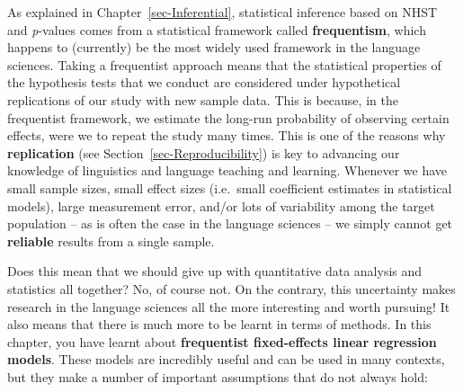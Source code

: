 \documentclass[
  letterpaper,
  DIV=11,
  numbers=noendperiod]{scrreprt}
\begin{document}
As explained in Chapter~\ref{sec-Inferential}, statistical inference
based on NHST and \emph{p}-values comes from a statistical framework
called \textbf{frequentism}, which happens to (currently) be the most
widely used framework in the language sciences. Taking a frequentist
approach means that the statistical properties of the hypothesis tests
that we conduct are considered under hypothetical replications of our
study with new sample data. This is because, in the frequentist
framework, we estimate the long-run probability of observing certain
effects, were we to repeat the study many times. This is one of the
reasons why \textbf{replication} (see Section~\ref{sec-Reproducibility})
is key to advancing our knowledge of linguistics and language teaching
and learning. Whenever we have small sample sizes, small effect sizes
(i.e.~small coefficient estimates in statistical models), large
measurement error, and/or lots of variability among the target
population -- as is often the case in the language sciences -- we simply
cannot get \textbf{reliable} results from a single sample.

Does this mean that we should give up with quantitative data analysis
and statistics all together? No, of course not. On the contrary, this
uncertainty makes research in the language sciences all the more
interesting and worth pursuing! It also means that there is much more to
be learnt in terms of methods. In this chapter, you have learnt about
\textbf{frequentist fixed-effects linear regression models}. These
models are incredibly useful and can be used in many contexts, but they
make a number of important assumptions that do not always hold:
\end{document}
